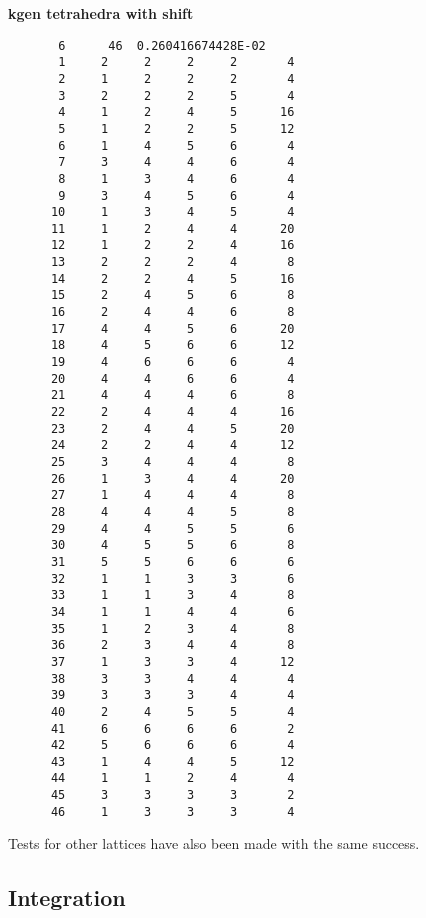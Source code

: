 {\bf kgen tetrahedra with shift}

\begin{verbatim}
       6      46  0.260416674428E-02 
       1     2     2     2     2       4
       2     1     2     2     2       4
       3     2     2     2     5       4
       4     1     2     4     5      16
       5     1     2     2     5      12
       6     1     4     5     6       4
       7     3     4     4     6       4
       8     1     3     4     6       4
       9     3     4     5     6       4
      10     1     3     4     5       4
      11     1     2     4     4      20
      12     1     2     2     4      16
      13     2     2     2     4       8
      14     2     2     4     5      16
      15     2     4     5     6       8
      16     2     4     4     6       8
      17     4     4     5     6      20
      18     4     5     6     6      12
      19     4     6     6     6       4
      20     4     4     6     6       4
      21     4     4     4     6       8
      22     2     4     4     4      16
      23     2     4     4     5      20
      24     2     2     4     4      12
      25     3     4     4     4       8
      26     1     3     4     4      20
      27     1     4     4     4       8
      28     4     4     4     5       8
      29     4     4     5     5       6
      30     4     5     5     6       8
      31     5     5     6     6       6
      32     1     1     3     3       6
      33     1     1     3     4       8
      34     1     1     4     4       6
      35     1     2     3     4       8
      36     2     3     4     4       8
      37     1     3     3     4      12
      38     3     3     4     4       4
      39     3     3     3     4       4
      40     2     4     5     5       4
      41     6     6     6     6       2
      42     5     6     6     6       4
      43     1     4     4     5      12
      44     1     1     2     4       4
      45     3     3     3     3       2
      46     1     3     3     3       4
\end{verbatim}

Tests for other lattices have also been made with the same success.


\subsection{Integration}

